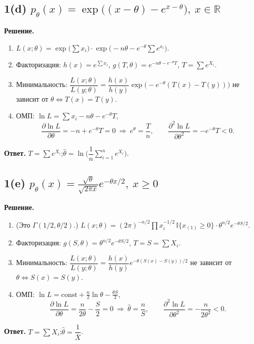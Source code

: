\documentclass[12pt,a4paper]{article}
\newcommand{\I}{\mathbb{I}}
\newcommand{\sol}{\par\noindent\textbf{Решение.} }
\newcommand{\ans}{\par\smallskip\noindent\textbf{Ответ.} }
\begin{document}
\subsection*{1(d) \quad $p_\theta(x)=\exp\big((x-\theta)-e^{x-\theta}\big),\ x\in\mathbb R$}
\sol
\begin{enumerate}
  \item $L(x;\theta)=\exp\Big(\sum x_i\Big)\cdot
        \exp\Big(-n\theta-e^{-\theta}\sum e^{x_i}\Big)$.
  \item Факторизация: $h(x)=e^{\sum x_i}$,
        $g(T,\theta)=e^{-n\theta-e^{-\theta}T}$, $T=\sum e^{X_i}$.
  \item Минимальность: $\dfrac{L(x;\theta)}{L(y;\theta)}
        =\dfrac{h(x)}{h(y)}\exp\big(-e^{-\theta}(T(x)-T(y))\big)$ не зависит
        от $\theta\iff T(x)=T(y)$.
  \item ОМП: $\ln L=\sum x_i-n\theta-e^{-\theta}T$,
  \[
    \frac{\partial\ln L}{\partial\theta}=-n+e^{-\theta}T=0
    \ \Rightarrow\ e^{\theta}=\frac Tn,\qquad
    \frac{\partial^2\ln L}{\partial\theta^2}=-e^{-\theta}T<0.
  \]
\end{enumerate}
\ans $T=\sum e^{X_i}$;\quad $\hat\theta=\ln\Big(\dfrac1n\sum_{i=1}^n e^{X_i}\Big)$.

\subsection*{1(e) \quad $p_\theta(x)=\frac{\sqrt\theta}{\sqrt{2\pi x}}e^{-\theta x/2},\ x\ge0$}
\sol
\begin{enumerate}
  \item (Это $\Gamma(1/2,\theta/2)$.)
  $L(x;\theta)=(2\pi)^{-n/2}\prod x_i^{-1/2}\,\I\{x_{(1)}\ge0\}\cdot
   \theta^{n/2}e^{-\theta S/2}$.
  \item Факторизация: $g(S,\theta)=\theta^{n/2}e^{-\theta S/2}$, $T=S=\sum X_i$.
  \item Минимальность: $\dfrac{L(x;\theta)}{L(y;\theta)}
        =\dfrac{h(x)}{h(y)}e^{-\theta(S(x)-S(y))/2}$ не зависит от
        $\theta\iff S(x)=S(y)$.
  \item ОМП: $\ln L=\text{const}+\frac n2\ln\theta-\frac{\theta S}{2}$,
  \[
    \frac{\partial\ln L}{\partial\theta}=\frac{n}{2\theta}-\frac S2=0
    \ \Rightarrow\ \hat\theta=\frac nS,\qquad
    \frac{\partial^2\ln L}{\partial\theta^2}=-\frac{n}{2\theta^2}<0.
  \]
\end{enumerate}
\ans $T=\sum X_i$;\quad $\hat\theta=\dfrac1{\bar X}$.
\end{document}

